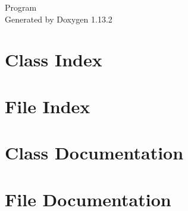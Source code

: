 \documentclass[twoside]{book}
\newcommand{\+}{\discretionary{\mbox{\scriptsize$\hookleftarrow$}}{}{}}
\newcommand{\clearemptydoublepage}{%
    \newpage{\pagestyle{empty}\cleardoublepage}%
  }
\begin{document}
  \raggedbottom
    \hypersetup{pageanchor=false,
                bookmarksnumbered=true,
                pdfencoding=unicode
               }
  \begin{titlepage}
  \vspace*{7cm}
  \begin{center}%
  {\Large Program}\\
  \vspace*{1cm}
  {\large Generated by Doxygen 1.13.2}\\
  \end{center}
  \end{titlepage}
  \clearemptydoublepage
  \tableofcontents
  \clearemptydoublepage
  \hypersetup{pageanchor=true}
\chapter{Class Index}

\chapter{File Index}

\chapter{Class Documentation}



\chapter{File Documentation}


  \backmatter
  \newpage
  \clearemptydoublepage
  \printindex
\end{document}
